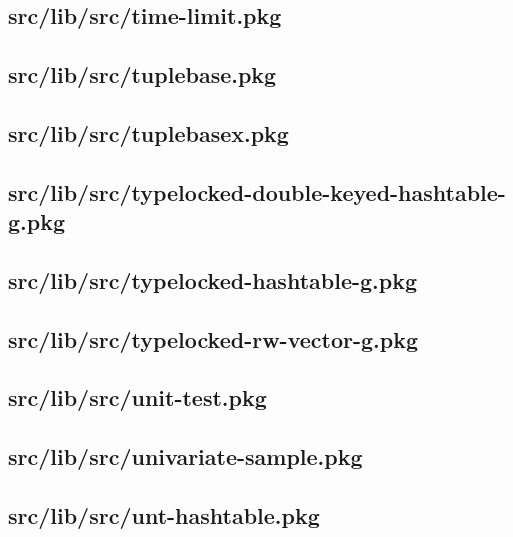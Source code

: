 \subsection{src/lib/src/time-limit.pkg}


\subsection{src/lib/src/tuplebase.pkg}


\subsection{src/lib/src/tuplebasex.pkg}


\subsection{src/lib/src/typelocked-double-keyed-hashtable-g.pkg}


\subsection{src/lib/src/typelocked-hashtable-g.pkg}


\subsection{src/lib/src/typelocked-rw-vector-g.pkg}


\subsection{src/lib/src/unit-test.pkg}


\subsection{src/lib/src/univariate-sample.pkg}


\subsection{src/lib/src/unt-hashtable.pkg}


